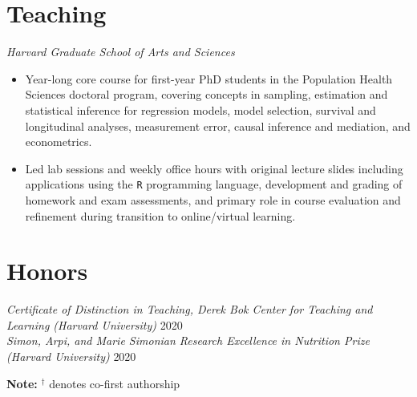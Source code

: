 \documentclass{cv_style}
\begin{document}

\parskip -5pt 
\section{Teaching}

\textit{Harvard Graduate School of Arts and Sciences}
\begin{itemize}
  \vspace{0em} \item Year-long core course for first-year PhD students in the Population Health Sciences doctoral program, covering concepts in sampling, estimation and statistical inference for regression models, model selection, survival and longitudinal analyses, measurement error, causal inference and mediation, and econometrics. 
  \item \parskip 1pt Led lab sessions and weekly office hours with original lecture slides including applications using the \texttt{R} programming language, development and grading of homework and exam assessments, and primary role in course evaluation and refinement during transition to online/virtual learning.  
\end{itemize}

\vspace {-.8em} 
\section{Honors}

\textit{Certificate of Distinction in Teaching, Derek Bok Center for Teaching and Learning (Harvard University)} \hfill {2020}\\
\textit{Simon, Arpi, and Marie Simonian Research Excellence in Nutrition Prize (Harvard University)} \hfill {2020}

\parskip -5pt 
\nocite{*}
\printbibliography[title=Publications]

\vspace{1em} \textbf{Note:} $^\dagger$ denotes co-first authorship

\end{document}
